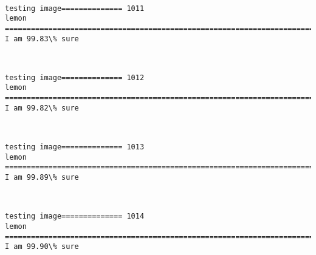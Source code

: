 \documentclass[11pt]{article}
\begin{document}
    \begin{center}
    \end{center}
    { \hspace*{\fill} \\}
    
    \begin{Verbatim}[commandchars=\\\{\}]
testing image============== 1011
lemon
============================================================================
I am 99.83\% sure

    \end{Verbatim}

    \begin{center}
    \end{center}
    { \hspace*{\fill} \\}
    
    \begin{Verbatim}[commandchars=\\\{\}]
testing image============== 1012
lemon
============================================================================
I am 99.82\% sure

    \end{Verbatim}

    \begin{center}
    \end{center}
    { \hspace*{\fill} \\}
    
    \begin{Verbatim}[commandchars=\\\{\}]
testing image============== 1013
lemon
============================================================================
I am 99.89\% sure

    \end{Verbatim}

    \begin{center}
    \end{center}
    { \hspace*{\fill} \\}
    
    \begin{Verbatim}[commandchars=\\\{\}]
testing image============== 1014
lemon
============================================================================
I am 99.90\% sure

    \end{Verbatim}
\end{document}
